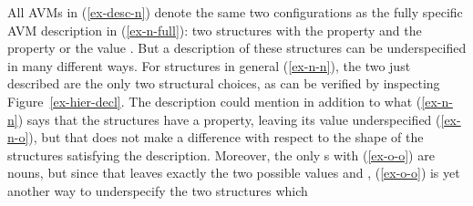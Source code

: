 \documentclass[output=paper
 	        ,biblatex
                ,babelshorthands
                ,newtxmath
                ,draftmode
                ,colorlinks, citecolor=brown
]{langscibook}
\begin{document}
All AVMs in (\ref{ex-desc-n}) denote the same two configurations as
the fully specific AVM description in (\ref{ex-n-full}): two
 structures with the  property  and
the  property  or the  value
. But a description of these structures can be
underspecified in many different ways. For  structures in
general (\ref{ex-n-n}), the two just described are the only two
structural choices, as can be verified by inspecting
Figure~\ref{ex-hier-decl}. The description could mention in addition
to what (\ref{ex-n-n}) says that
the structures have a  property, leaving its value
underspecified (\ref{ex-n-o}), but that does not make a difference
with respect to the shape of the structures satisfying the
description. Moreover, the only s with 
(\ref{ex-o-o}) are nouns, but since that leaves exactly the two possible
 values  and , (\ref{ex-o-o}) is
yet another way to underspecify the two structures which
\end{document}
